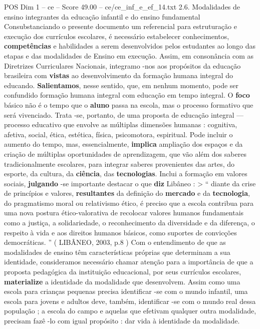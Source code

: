 \begin{textsample}{POS Dim 1 – ce – Score 49.00 – ce/ce\_inf\_e\_ef\_14.txt}  \label{ex:f1_pos_050}
2.6.
Modalidades de ensino integrantes da educação infantil e do ensino fundamental Consubstanciando o presente documento um referencial para estruturação e execução dos currículos escolares, é necessário estabelecer conhecimentos, \textbf{competências} e habilidades a serem desenvolvidos pelos estudantes ao longo das etapas e das modalidades de Ensino em execução.
Assim, em consonância com as Diretrizes Curriculares Nacionais, integramo -nos aos propósitos da educação brasileira com \textbf{vistas} ao desenvolvimento da formação humana integral do educando. \textbf{Salientamos}, nesse sentido, que, em nenhum momento, pode ser confundido formação humana integral com educação em tempo integral.
O \textbf{foco} básico não é o tempo que o \textbf{aluno} passa na escola, mas o processo formativo que será vivenciado.
Trata -se, portanto, de uma proposta de educação integral — processo educativo que envolve as múltiplas dimensões humanas : cognitiva, afetiva, social, ética, estética, física, psicomotora, espiritual.
Pode incluir o aumento do tempo, mas, essencialmente, \textbf{implica} ampliação dos espaços e da criação de múltiplas oportunidades de aprendizagem, que vão além dos saberes tradicionalmente escolares, para integrar saberes provenientes das artes, do esporte, da cultura, da \textbf{ciência}, das \textbf{tecnologias}.
Inclui a formação em valores sociais, \textbf{julgando} -se importante destacar o que \textbf{diz} Libâneo : > “ diante da crise de princípios e valores, \textbf{resultantes} da definição do \textbf{mercado} e da \textbf{tecnologia}, do pragmatismo moral ou relativismo ético, é preciso que a escola contribua para uma nova postura ético-valorativa de recolocar valores humanos fundamentais como a justiça, a solidariedade, o reconhecimento da diversidade e da diferença, o respeito à vida e aos direitos humanos básicos, como suportes de convicções democráticas. ” ( LIBÂNEO, 2003, p.8 ) Com o entendimento de que as modalidades de ensino têm características próprias que determinam a sua identidade, consideramos necessário chamar atenção para a importância de que a proposta pedagógica da instituição educacional, por seus currículos escolares, \textbf{materialize} a identidade da modalidade que desenvolvem.
Assim como uma escola para crianças pequenas precisa identificar -se com o mundo infantil, uma escola para jovens e adultos deve, também, identificar -se com o mundo real dessa população ; a escola do campo e aquelas que efetivam qualquer outra modalidade, precisam fazê -lo com igual propósito : dar vida à identidade da modalidade.

\end{textsample}
